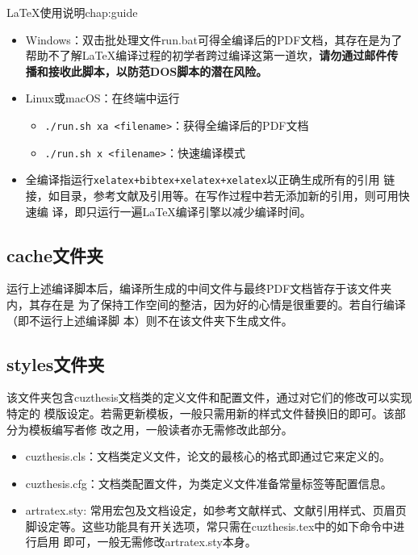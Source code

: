 \begin{cuzchapter}{\LaTeX{}使用说明}{chap:guide}
    \begin{itemize}
        \item Windows：双击批处理文件run.bat可得全编译后的PDF文档，其存在是为了
              帮助不了解\LaTeX{}编译过程的初学者跨过编译这第一道坎，\textbf{请勿通过邮件传
                  播和接收此脚本，以防范DOS脚本的潜在风险。}
        \item Linux或macOS：在终端中运行
              \begin{itemize}
                  \item \verb|./run.sh xa <filename>|：获得全编译后的PDF文档
                  \item \verb|./run.sh x <filename>|：快速编译模式
              \end{itemize}
        \item 全编译指运行\verb|xelatex+bibtex+xelatex+xelatex|以正确生成所有的引用
              链接，如目录，参考文献及引用等。在写作过程中若无添加新的引用，则可用快速编
              译，即只运行一遍\LaTeX{}编译引擎以减少编译时间。
    \end{itemize}

    \subsection{cache文件夹}\label{sub:cache}

    运行上述编译脚本后，编译所生成的中间文件与最终PDF文档皆存于该文件夹内，其存在是
    为了保持工作空间的整洁，因为好的心情是很重要的。若自行编译（即不运行上述编译脚
    本）则不在该文件夹下生成文件。

    \subsection{styles文件夹}\label{sub:styles}

    该文件夹包含cuzthesis文档类的定义文件和配置文件，通过对它们的修改可以实现特定的
    模版设定。若需更新模板，一般只需用新的样式文件替换旧的即可。该部分为模板编写者修
    改之用，一般读者亦无需修改此部分。

    \begin{itemize}
        \item cuzthesis.cls：文档类定义文件，论文的最核心的格式即通过它来定义的。
        \item cuzthesis.cfg：文档类配置文件，为类定义文件准备常量标签等配置信息。
        \item artratex.sty: 常用宏包及文档设定，如参考文献样式、文献引用样式、页眉页
              脚设定等。这些功能具有开关选项，常只需在cuzthesis.tex中的如下命令中进行启用
              即可，一般无需修改artratex.sty本身。


\end{itemize}
\end{cuzchapter}
